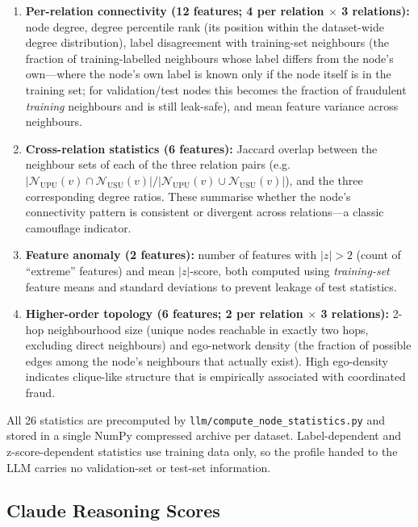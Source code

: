 \begin{enumerate}
    \item \textbf{Per-relation connectivity (12 features; 4 per relation $\times$ 3 relations):} node degree, degree percentile rank (its position within the dataset-wide degree distribution), label disagreement with training-set neighbours (the fraction of training-labelled neighbours whose label differs from the node's own---where the node's own label is known only if the node itself is in the training set; for validation/test nodes this becomes the fraction of fraudulent \emph{training} neighbours and is still leak-safe), and mean feature variance across neighbours.
    \item \textbf{Cross-relation statistics (6 features):} Jaccard overlap between the neighbour sets of each of the three relation pairs (e.g.\ $|\mathcal{N}_{\text{UPU}}(v) \cap \mathcal{N}_{\text{USU}}(v)| / |\mathcal{N}_{\text{UPU}}(v) \cup \mathcal{N}_{\text{USU}}(v)|$), and the three corresponding degree ratios. These summarise whether the node's connectivity pattern is consistent or divergent across relations---a classic camouflage indicator.
    \item \textbf{Feature anomaly (2 features):} number of features with $|z| > 2$ (count of ``extreme'' features) and mean $|z|$-score, both computed using \emph{training-set} feature means and standard deviations to prevent leakage of test statistics.
    \item \textbf{Higher-order topology (6 features; 2 per relation $\times$ 3 relations):} 2-hop neighbourhood size (unique nodes reachable in exactly two hops, excluding direct neighbours) and ego-network density (the fraction of possible edges among the node's neighbours that actually exist). High ego-density indicates clique-like structure that is empirically associated with coordinated fraud.
\end{enumerate}

All 26 statistics are precomputed by \texttt{llm/compute\_node\_statistics.py} and stored in a single NumPy compressed archive per dataset. Label-dependent and z-score-dependent statistics use training data only, so the profile handed to the LLM carries no validation-set or test-set information.

\subsection{Claude Reasoning Scores}
\label{sec:claude-reasoning}

